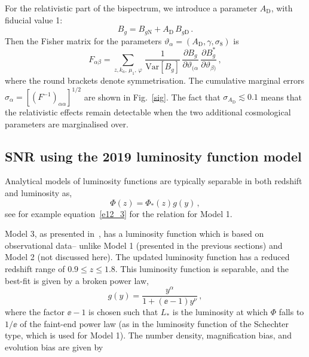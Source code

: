 For the relativistic part of the bispectrum, we introduce a parameter  $A_{\mathrm{D}}$, with fiducial value 1: 
\begin{equation}
B_g=B_{g\mathrm{N}}+A_{\mathrm{D}}\,B_{g\mathrm{D}} \,.
\end{equation}
Then the Fisher matrix for the parameters  $\vartheta_\alpha=(A_{\mathrm{D}},\gamma,\sigma_8)$ is
\begin{equation}
F_{\alpha\beta} = 
\sum_{z,k_a,\,\mu_{1},\,\varphi}\,\frac{1}{{\mathrm{Var}} [{B_{g}}]}
\,\frac{\partial B_{g}}{\partial \vartheta_{(\alpha}}\,\frac{\partial B^*_{g}}{\partial \vartheta_{\beta)}}\,,\label{fm}
\end{equation} 
where the round brackets denote symmetrisation. The cumulative marginal errors $\sigma_\alpha = [(F^{-1})_{\alpha\alpha}]^{1/2}$  are shown in Fig.~\ref{sig}. The fact that $\sigma_{A_{\mathrm{D}}}\lesssim 0.1$  means that the relativistic effects remain detectable when the two additional cosmological parameters are marginalised over.
%

\subsection{SNR using the 2019 luminosity function model}\label{ssec:snrmodel3}

Analytical models of luminosity functions are typically separable in both redshift and luminosity as, 
\begin{equation}
    \Phi(z) = \Phi_*(z) g(y)\,,
\end{equation}
see for example equation~\eqref{e12_3} for the relation for Model 1. 

Model 3, as presented in~\cite{Pozzetti:2016cch}, has a luminosity function which is based on observational data-- unlike Model 1 (presented in the previous sections) and Model 2 (not discussed here). The updated luminosity function has a reduced redshift range of $0.9 \leq z \leq 1.8$. This luminosity function is separable, and the best-fit is given by a broken power law, 
\begin{equation}
    g(y) = \frac{y^\alpha}{1 + (\ee - 1)y^\nu}\,,
\end{equation}
where the factor $\ee - 1$ is chosen such that $L_*$ is the luminosity at which $\Phi$ falls to $1/\ee$ of the faint-end power law (as in the luminosity function of the Schechter type, which is used for Model 1). The number density, magnification bias, and evolution bias are given by 

